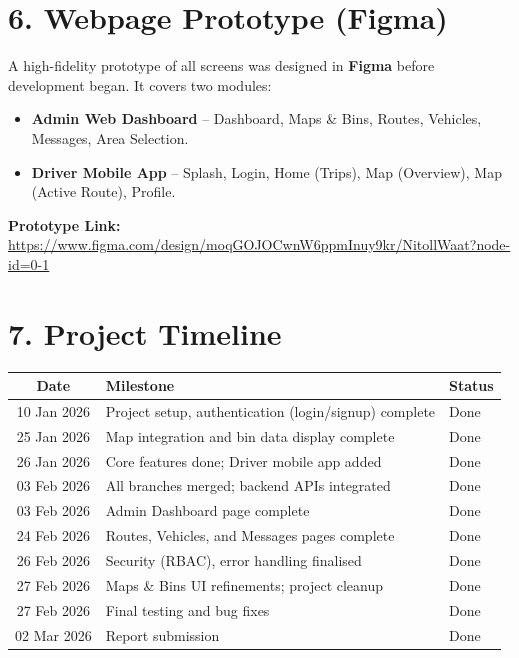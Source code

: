 \documentclass[12pt,a4paper]{article}
\begin{document}
\section*{6. Webpage Prototype (Figma)}

A high-fidelity prototype of all screens was designed in \textbf{Figma}
before development began. It covers two modules:

\begin{itemize}[leftmargin=*]
    \item \textbf{Admin Web Dashboard} -- Dashboard, Maps \& Bins,
          Routes, Vehicles, Messages, Area Selection.
    \item \textbf{Driver Mobile App} -- Splash, Login, Home (Trips),
          Map (Overview), Map (Active Route), Profile.
\end{itemize}

\textbf{Prototype Link:}\\
\url{https://www.figma.com/design/moqGOJOCwnW6ppmInuy9kr/NitollWaat?node-id=0-1}

\clearpage
\section*{7. Project Timeline}

\begin{center}
\begin{tabular}{cll}
\toprule
\textbf{Date} & \textbf{Milestone} & \textbf{Status} \\
\midrule
10 Jan 2026 & Project setup, authentication (login/signup) complete & Done \\
25 Jan 2026 & Map integration and bin data display complete         & Done \\
26 Jan 2026 & Core features done; Driver mobile app added           & Done \\
03 Feb 2026 & All branches merged; backend APIs integrated          & Done \\
03 Feb 2026 & Admin Dashboard page complete                         & Done \\
24 Feb 2026 & Routes, Vehicles, and Messages pages complete         & Done \\
26 Feb 2026 & Security (RBAC), error handling finalised             & Done \\
27 Feb 2026 & Maps \& Bins UI refinements; project cleanup          & Done \\
27 Feb 2026 & Final testing and bug fixes                           & Done \\
02 Mar 2026 & Report submission                                     & Done \\
\bottomrule
\end{tabular}
\end{center}
\end{document}

